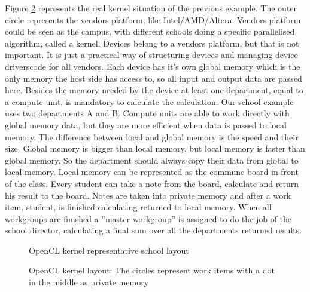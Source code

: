 \documentclass[12pt,a4paper,english,twoside,openright]{tutthesis}
\begin{document}
Figure \ref{fig:kernelLayout} represents the real kernel situation of the previous example. The outer circle represents the vendors platform, like Intel/AMD/Altera. Vendors platform could be seen as the campus, with different schools doing a specific parallelised algorithm, called a kernel. Devices belong to a vendors platform, but that is not important. It is just a practical way of structuring devices and managing device driverscode for all vendors. Each device has it's own global memory which is the only memory the host side has access to, so all input and output data are passed here. Besides the memory needed by the device at least one department, equal to a compute unit, is mandatory to calculate the calculation. Our school example uses two departments A and B. Compute units are able to work directly with global memory data, but they are more efficient when data is passed to local memory. The difference between local and global memory is the speed and their size. Global memory is bigger than local memory, but local memory is faster than global memory. So the department should always copy their data from global to local memory. Local memory can be represented as the commune board in front of the class. Every student can take a note from the board, calculate and return his result to the board. Notes are taken into private memory and after a work item, student, is finished calculating returned to local memory. When all workgroups are finished a ''master workgroup'' is assigned to do the job of the school director, calculating a final sum over all the departments returned results.
\begin{figure}\centering
	
	\caption{OpenCL kernel representative school layout}\label{fig:kernelSchoolLayout}
\end{figure}
\begin{figure}\centering
	
	\caption{OpenCL kernel layout: The circles represent work items with a dot in the middle as private memory}\label{fig:kernelLayout}
\end{figure}
\end{document}
